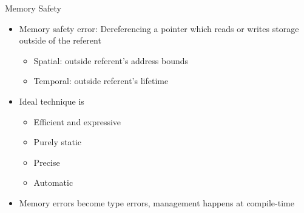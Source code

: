 \documentclass[aspectratio=169]{beamer}
\begin{document}
\begin{frame}{Memory Safety}
\begin{itemize}[<+->]
    \item Memory safety error: Dereferencing a pointer which reads or writes storage outside of the referent
        \begin{itemize}
            \item Spatial: outside referent's \alert{address bounds}
            \item Temporal: outside referent's \alert{lifetime}
        \end{itemize}
    \item Ideal technique is
        \begin{itemize}
            \item Efficient and expressive %
            \item Purely static %
            \item Precise %
            \item Automatic %
        \end{itemize}
    \item Memory errors become \alert{type errors}, management happens at \alert{compile-time}
\end{itemize}
\end{frame}

\end{document}
